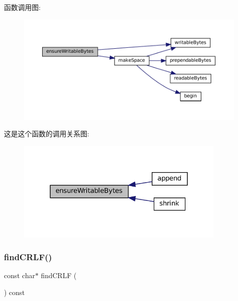 函数调用图\+:
\nopagebreak
\begin{figure}[H]
\begin{center}
\leavevmode
\includegraphics[width=350pt]{classmuduo_1_1net_1_1Buffer_a1185aa5bbe069f50c8d46a9f8d5aac32_cgraph}
\end{center}
\end{figure}
这是这个函数的调用关系图\+:
\nopagebreak
\begin{figure}[H]
\begin{center}
\leavevmode
\includegraphics[width=287pt]{classmuduo_1_1net_1_1Buffer_a1185aa5bbe069f50c8d46a9f8d5aac32_icgraph}
\end{center}
\end{figure}
\mbox{\label{classmuduo_1_1net_1_1Buffer_a757db069730494fc47e500b29851c6c5}} 
\subsubsection{\texorpdfstring{find\+C\+R\+L\+F()}{findCRLF()}\hspace{0.1cm}{\footnotesize\ttfamily [1/2]}}
{\footnotesize\ttfamily const char$\ast$ find\+C\+R\+LF (\begin{DoxyParamCaption}{ }\end{DoxyParamCaption}) const\hspace{0.3cm}{\ttfamily [inline]}}



